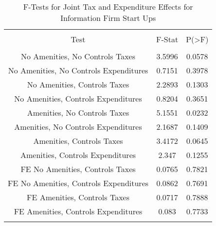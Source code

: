 
\begin{table}[!htbp] \centering 
  \caption{F-Tests for Joint Tax and Expenditure Effects for Information Firm Start Ups} 
  \label{51Ftests} 
\begin{tabular}{@{\extracolsep{5pt}} ccc} 
\\[-1.8ex]\hline 
\hline \\[-1.8ex] 
Test & F-Stat & P(\textgreater F) \\ 
\hline \\[-1.8ex] 
No Amenities, No Controls Taxes & 3.5996 & 0.0578 \\ 
No Amenities, No Controls Expenditures & 0.7151 & 0.3978 \\ 
No Amenities, Controls Taxes & 2.2893 & 0.1303 \\ 
No Amenities, Controls Expenditures & 0.8204 & 0.3651 \\ 
Amenities, No Controls Taxes & 5.1551 & 0.0232 \\ 
Amenities, No Controls Expenditures & 2.1687 & 0.1409 \\ 
Amenities, Controls Taxes & 3.4172 & 0.0645 \\ 
Amenities, Controls Expenditures & 2.347 & 0.1255 \\ 
FE No Amenities, Controls Taxes & 0.0765 & 0.7821 \\ 
FE No Amenities, Controls Expenditures & 0.0862 & 0.7691 \\ 
FE Amenities, Controls Taxes & 0.0717 & 0.7888 \\ 
FE Amenities, Controls Expenditures & 0.083 & 0.7733 \\ 
\hline \\[-1.8ex] 
\end{tabular} 
\end{table} 
